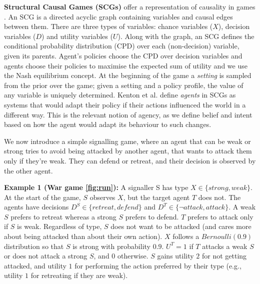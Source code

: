 \documentclass[submission,publicdomain,creativecommons noncommercial]{eptcs}
\begin{document}
\textbf{Structural Causal Games (SCGs)} offer a representation of causality in games \cite{Hammond}. 
An SCG is a directed acyclic graph containing variables and causal edges between them. There are three types of variables: chance variables ($X$), decision variables ($D$) and utility variables ($U$). Along with the graph, an SCG defines the conditional probability distribution (CPD) over each (non-decision) variable, given its parents. Agent's policies choose the CPD over decision variables and agents choose their policies to maximise the expected sum of utility and we use the Nash equilibrium concept. At the beginning of the game a \emph{setting} is sampled from the prior over the game; given a setting and a policy profile, the value of any variable is uniquely determined.
 Kenton et al. \cite{kenton2022discovering} define \emph{agents} in SCGs as systems that would adapt their policy if their actions influenced the world in a different way.
This is the relevant notion of agency, as
we define belief and intent based on how the agent would adapt its behaviour to such changes. 

We now introduce a simple signalling game, where an agent that can be weak or strong tries to avoid being attacked by another agent, that wants to attack them only if they're weak. They can defend or retreat, and their decision is observed by the other agent.

\textbf{Example 1 (War game \cref{fig:run}):} A signaller S has type $X \in \{strong, weak\}$. At the start of the game, $S$ observes $X$, but the target agent $T$ does not. The agents have decisions $D^S \in \{retreat, defend\}$
and $D^T \in \{\neg attack, attack\}$. A weak $S$ prefers to retreat whereas a strong $S$ prefers to defend. $T$ prefers to attack only if $S$ is weak. Regardless of type, $S$ does not want to be attacked (and cares more about being attacked than about their own action). $X$ follows a $Bernoulli(0.9)$ distribution so that $S$ is strong with probability $0.9$. $U^T = 1$ if $T$ attacks a weak $S$ or does not attack a strong $S$, and 0 otherwise. $S$ gains utility $2$ for not getting attacked, and utility $1$ for performing the action preferred by their type (e.g., utility $1$ for retreating if they are weak).
\end{document}

